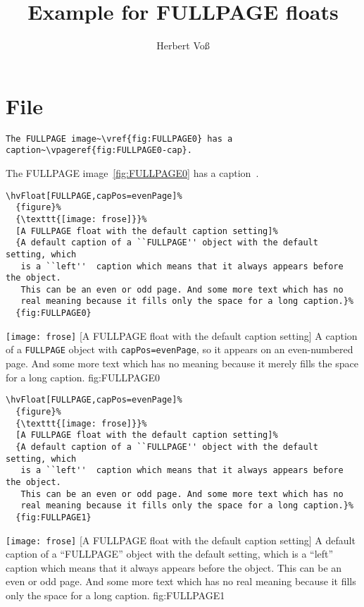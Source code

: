 \documentclass{scrartcl}
\begin{document}
\title{Example for FULLPAGE floats}
\author{Herbert Voß}
\maketitle

\tableofcontents

\blinddocument

\section{File \texttt{\jobname}}

\begin{lstlisting}
The FULLPAGE image~\vref{fig:FULLPAGE0} has a caption~\vpageref{fig:FULLPAGE0-cap}.
\end{lstlisting}

The FULLPAGE image~\vref{fig:FULLPAGE0} has a caption~.

\begin{lstlisting}
\hvFloat[FULLPAGE,capPos=evenPage]%
  {figure}%
  {\texttt{[image: frose]}}%
  [A FULLPAGE float with the default caption setting]%
  {A default caption of a ``FULLPAGE'' object with the default setting, which
   is a ``left''  caption which means that it always appears before the object.
   This can be an even or odd page. And some more text which has no
   real meaning because it fills only the space for a long caption.}%
  {fig:FULLPAGE0}
\end{lstlisting}


\Float[default]
%
  {\texttt{[image: frose]}}%
  [A FULLPAGE float with the default caption setting]%
  {A caption of a \texttt{FULLPAGE} object with \texttt{capPos=evenPage}, 
   so it appears on an even-numbered page.
   And some more text which has no
   meaning because it merely fills the space for a long caption.}%
  {fig:FULLPAGE0}

\blinddocument

\begin{lstlisting}
\hvFloat[FULLPAGE,capPos=evenPage]%
  {figure}%
  {\texttt{[image: frose]}}%
  [A FULLPAGE float with the default caption setting]%
  {A default caption of a ``FULLPAGE'' object with the default setting, which
   is a ``left''  caption which means that it always appears before the object.
   This can be an even or odd page. And some more text which has no
   real meaning because it fills only the space for a long caption.}%
  {fig:FULLPAGE1}
\end{lstlisting}


\Float[default]
%
  {\texttt{[image: frose]}}%
  [A FULLPAGE float with the default caption setting]%
  {A default caption of a ``FULLPAGE'' object with the default setting, which
   is a ``left''  caption which means that it always appears before the object.
   This can be an even or odd page. And some more text which has no
   real meaning because it fills only the space for a long caption.}%
  {fig:FULLPAGE1}

\blinddocument

\Blindtext

\blindtext
\end{document}
